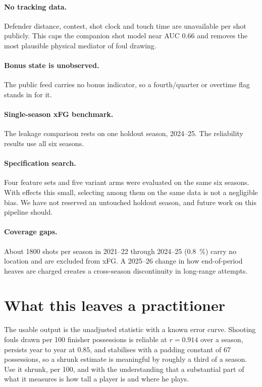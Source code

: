 \documentclass[11pt,letterpaper]{article}
\begin{document}
\paragraph{No tracking data.} Defender distance, contest, shot clock and touch
time are unavailable per shot publicly. This caps the companion shot model near
AUC 0.66 \citep{cervone2016multiresolution} and removes the most plausible
physical mediator of foul drawing.

\paragraph{Bonus state is unobserved.} The public feed carries no bonus indicator,
so a fourth\-/quarter or overtime flag stands in for it.

\paragraph{Single-season xFG benchmark.} The leakage comparison rests on one
holdout season, 2024--25. The reliability results use all six seasons.

\paragraph{Specification search.} Four feature sets and five variant arms were
evaluated on the same six seasons. With effects this small, selecting among them
on the same data is not a negligible bias. We have not reserved an untouched
holdout season, and future work on this pipeline should.

\paragraph{Coverage gaps.} About \num{1800} shots per season in 2021--22 through
2024--25 (\SI{0.8}{\percent}) carry no location and are excluded from xFG. A
2025--26 change in how end-of-period heaves are charged creates a cross-season
discontinuity in long-range attempts.

\section{What this leaves a practitioner}

The usable output is the unadjusted statistic with a known error curve. Shooting
fouls drawn per 100 finisher possessions is reliable at $r = 0.914$ over a
season, persists year to year at $0.85$, and stabilises with a padding constant of
67 possessions, so a shrunk estimate is meaningful by roughly a third of a season.
Use it shrunk, per 100, and with the understanding that a substantial part of what
it measures is how tall a player is and where he plays.
\end{document}
